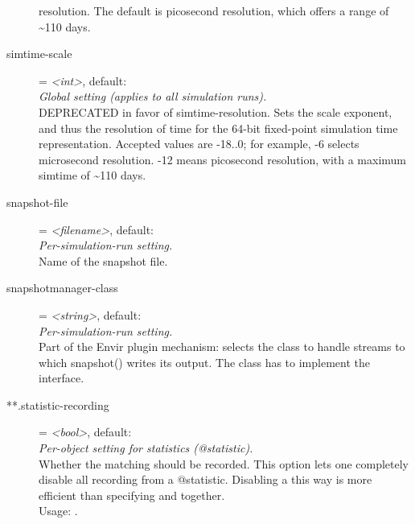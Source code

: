 \begin{description}
    resolution. The default is picosecond resolution, which offers a range of
    {\textasciitilde}110 days.
\item[simtime-scale] = \textit{<int>}, default: \\
    \textit{Global setting (applies to all simulation runs).}\\
    DEPRECATED in favor of simtime-resolution. Sets the scale exponent, and
    thus the resolution of time for the 64-bit fixed-point simulation time
    representation. Accepted values are -18..0; for example, -6 selects
    microsecond resolution. -12 means picosecond resolution, with a maximum
    simtime of {\textasciitilde}110 days.
\item[snapshot-file] = \textit{<filename>}, default: \\
    \textit{Per-simulation-run setting.}\\
    Name of the snapshot file.
\item[snapshotmanager-class] = \textit{<string>}, default: \\
    \textit{Per-simulation-run setting.}\\
    Part of the Envir plugin mechanism: selects the class to handle streams to
    which snapshot() writes its output. The class has to implement the
     interface.
\item[**.statistic-recording] = \textit{<bool>}, default: \\
    \textit{Per-object setting for statistics (@statistic).}\\
    Whether the matching  should be recorded. This
    option lets one completely disable all recording from a @statistic.
    Disabling a  this way is more efficient than
    specifying
     and
    together.\\
    Usage:
    .\\

\end{description}
